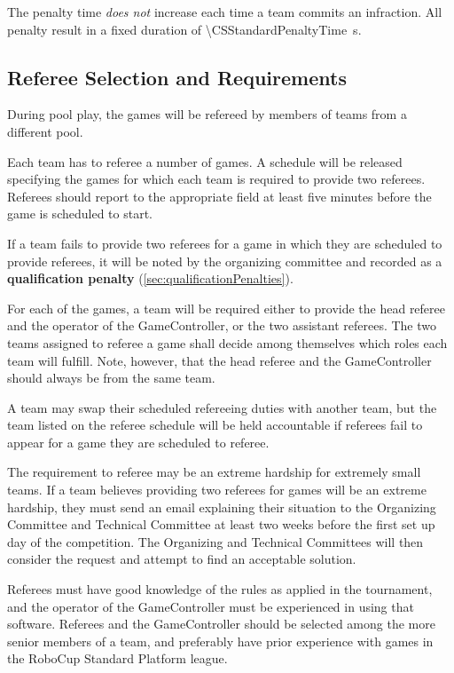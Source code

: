 The penalty time \emph{does not} increase each time a team commits an infraction. All penalty result in a fixed duration of \qty{\CSStandardPenaltyTime}{\second}.

\subsection{Referee Selection and Requirements}
\label{sec:refSelection}
During pool play, the games will be refereed by members of teams from a different pool.

Each team has to referee a number of games. A schedule will be released specifying the games for which each team is required to provide two referees. Referees should report to the appropriate field at least five minutes before the game is scheduled to start.

If a team fails to provide two referees for a game in which they are scheduled to provide referees, it will be noted by the organizing committee and recorded as a \textbf{qualification penalty} (\cref{sec:qualificationPenalties}).

For each of the games, a team will be required either to provide the head referee and the operator of the GameController, or the two assistant referees.  The two teams assigned to referee a game shall decide among themselves which roles each team will fulfill. Note, however, that the head referee and the GameController should always be from the same team.

A team may swap their scheduled refereeing duties with another team, but the team listed on the referee schedule will be held accountable if referees fail to appear for a game they are scheduled to referee.

The requirement to referee may be an extreme hardship for extremely small teams.  If a team believes providing two referees for games will be an extreme hardship, they must send an email explaining their situation to the Organizing Committee and Technical Committee at least two weeks before the first set up day of the competition.  The Organizing and Technical Committees will then consider the request and attempt to find an acceptable solution.

Referees must have good knowledge of the rules as applied in the tournament, and the operator of the GameController must be experienced in using that software. Referees and the GameController should be selected among the more senior members of a team, and preferably have prior experience with games in the RoboCup Standard Platform league.

